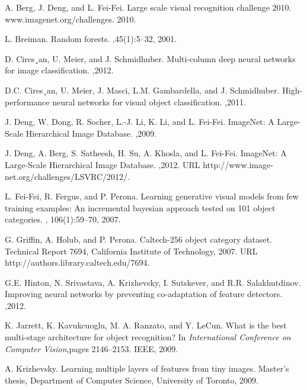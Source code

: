 \documentclass[12pt]{article}
\begin{document}
\begin{CJK*}{UTF8}{gkai}
\begin{thebibliography}{1}
A. Berg, J. Deng, and L. Fei-Fei. 
\newblock Large scale visual recognition challenge 2010. 
\newblock www.imagenet.org/challenges. 2010. 

L. Breiman. 
\newblock Random forests.
,45(1):5–32, 2001. 

D. Cires¸an, U. Meier, and J. Schmidhuber.  
\newblock Multi-column deep neural networks for image classification. 
,2012.

D.C. Cires¸an, U. Meier, J. Masci, L.M. Gambardella, and J. Schmidhuber.   
\newblock High-performance neural networks for visual object classification. 
,2011.

J. Deng, W. Dong, R. Socher, L.-J. Li, K. Li, and L. Fei-Fei. 
\newblock ImageNet: A Large-Scale Hierarchical Image Database.
,2009.

J. Deng, A. Berg, S. Satheesh, H. Su, A. Khosla, and L. Fei-Fei.  
\newblock ImageNet: A Large-Scale Hierarchical Image Database.
,2012.  URL http://www.image-net.org/challenges/LSVRC/2012/. 

L. Fei-Fei, R. Fergus, and P. Perona. 
\newblock  Learning generative visual models from few training examples:  An incremental bayesian approach tested on 101 object categories. 
, 106(1):59–70, 2007.

G. Griffin, A. Holub, and P. Perona.
\newblock Caltech-256 object category dataset. 
\newblock Technical Report 7694, California Institute of Technology, 2007. URL http://authors.library.caltech.edu/7694.

G.E. Hinton, N. Srivastava, A. Krizhevsky, I. Sutskever, and R.R. Salakhutdinov.  
\newblock  Improving neural networks by preventing co-adaptation of feature detectors. 
,2012.

K. Jarrett, K. Kavukcuoglu, M. A. Ranzato, and Y. LeCun. 
\newblock What is the best multi-stage architecture for object recognition?
\newblock In {\em International Conference on Computer Vision},pages 2146–2153. IEEE, 2009. 

A. Krizhevsky. 
\newblock Learning multiple layers of features from tiny images. 
\newblock Master’s thesis, Department of Computer Science, University of Toronto, 2009. 


\end{thebibliography}
\end{CJK*}
\end{document}
